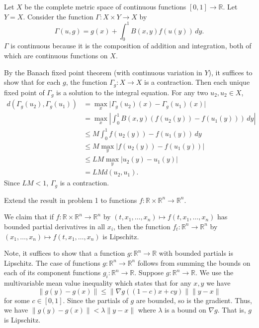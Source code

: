 \documentclass[12 pt, letterpaper]{hmcpset}
\begin{document}
\begin{solution}
	Let $X$ be the complete metric space of continuous functions $[0, 1] \to \mathbb{R}$. Let $Y = X$. Consider the function $\Gamma : X \times Y \to X$ by
	 \[
		\Gamma(u, g) = g(x) + \int_{0}^{1} B(x, y) f(u(y)) \, dy.
	\]
	$\Gamma$ is continuous because it is the composition of addition and integration, both of which are continuous functions on $X$.

	By the Banach fixed point theorem (with continuous variation in $Y$), it suffices to show that for each $g$, the function $\Gamma_{g} : X \to X$ is a contraction. Then each unique fixed point of $\Gamma_{g}$ is a solution to the integral equation. For any two $u_{2}, u_{2} \in X$,
	\begin{align*}
		d(\Gamma_{g}(u_{2}), \Gamma_{g}(u_{1})) & = \max_{x} \lvert \Gamma_{g}(u_{2})(x) - \Gamma_{g}(u_{1})(x) \rvert \\
							& = \max_{x} \left \lvert \int_{0}^{1} B(x, y) ( f(u_{2}(y)) - f(u_{1}(y)) ) \, dy \right \rvert \\
							& \le M \int_{0}^{1} f(u_{2}(y)) - f(u_{1}(y)) \, dy \\
							& \le M \max_{y} \lvert f(u_{2}(y)) - f(u_{1}(y)) \rvert \\
							& \le L M \max_{y} \lvert u_{2}(y) - u_{1}(y) \rvert \\
							& = L M d(u_{2}, u_{1}).
	\end{align*}
	Since $LM < 1$, $\Gamma_{g}$ is a contraction.
\end{solution}

\pagebreak

\begin{problem}[5.]
	Extend the result in problem 1 to functions $f : \mathbb{R} \times \mathbb{R}^{n} \to \mathbb{R}^{n}$.
\end{problem}

\begin{solution}
	We claim that if $f : \mathbb{R} \times \mathbb{R}^{n} \to \mathbb{R}^{n}$ by $(t, x_{1}, \dots, x_{n}) \mapsto f(t, x_{1}, \dots, x_{n})$ has bounded partial derivatives in all $x_{i}$, then the function $f_{t} : \mathbb{R}^{n} \to \mathbb{R}^{n}$ by $(x_{1}, \dots, x_{n}) \mapsto f(t, x_{1}, \dots, x_{n})$ is Lipschitz. 

	Note, it suffices to show that a function $g : \mathbb{R}^{n} \to \mathbb{R}$ with bounded partials is Lipschitz. The case of functions $g : \mathbb{R}^{n} \to \mathbb{R}^{n}$ follows from summing the bounds on each of its component functions $g_{i} : \mathbb{R}^{n} \to \mathbb{R}$. Suppose $g : \mathbb{R}^{n} \to \mathbb{R}$. We use the multivariable mean value inequality which states that for any $x, y$ we have
	\[
		\lVert g(y) - g(x) \rVert \le \lVert \nabla g((1 - c) x + c y) \rVert \lVert y - x \rVert
	\]
	for some $c \in [0, 1]$. Since the partials of $g$ are bounded, so is the gradient. Thus, we have $\lVert g(y) - g(x) \rVert < \lambda \lVert y - x \rVert$ where $\lambda$ is a bound on $\nabla g$. That is, $g$ is Lipschitz.
\end{solution}
\end{document}
